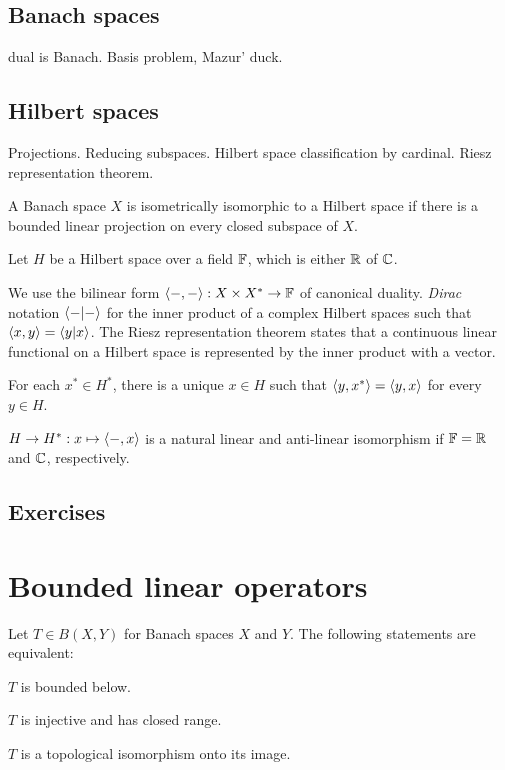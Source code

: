 \documentclass{../../large}
\begin{document}
\section{Banach spaces}
dual is Banach.
Basis problem, Mazur' duck.

\section{Hilbert spaces}
Projections. Reducing subspaces.
Hilbert space classification by cardinal.
Riesz representation theorem.
\begin{prb}
\begin{parts}
\item A Banach space $X$ is isometrically isomorphic to a Hilbert space if there is a bounded linear projection on every closed subspace of $X$.
\end{parts}
\end{prb}

\begin{prb}
Let $H$ be a Hilbert space over a field $\mathbb{F}$, which is either $\mathbb{R}$ of $\mathbb{C}$.


We use the bilinear form $\langle-,-\rangle:X\times X^*\to\mathbb{F}$ of canonical duality.
\emph{Dirac} notation $\langle-|-\rangle$ for the inner product of a complex Hilbert spaces such that $\langle x,y\rangle=\langle y|x\rangle$.
The Riesz representation theorem states that a continuous linear functional on a Hilbert space is represented by the inner product with a vector.
\begin{parts}
\item For each $x^*\in H^*$, there is a unique $x\in H$ such that $\langle y,x^*\rangle=\langle y,x\rangle$ for every $y\in H$.
\item $H\to H^*:x\mapsto\langle-,x\rangle$ is a natural linear and anti-linear isomorphism if $\mathbb{F}=\mathbb{R}$ and $\mathbb{C}$, respectively.
\end{parts}
\end{prb}



\section*{Exercises}







\chapter{Bounded linear operators}
\begin{prb}
Let $T\in B(X,Y)$ for Banach spaces $X$ and $Y$.
The following statements are equivalent:
\begin{parts}
\item $T$ is bounded below.
\item $T$ is injective and has closed range.
\item $T$ is a topological isomorphism onto its image.
\end{parts}
\end{prb}
\end{document}
